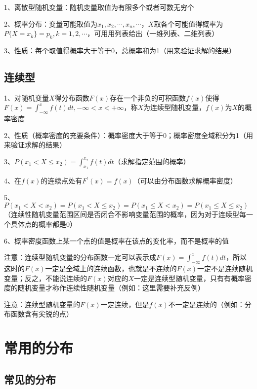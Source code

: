 1、离散型随机变量：随机变量取值为有限多个或者可数无穷个

2、概率分布：变量可能取值为$x_1,x_2,\cdots,x_n,\cdots$，$X$取各个可能值得概率为$P\{ X = x_k \} = p_k, k=1,2,\cdots$，可用用列表给出（一维列表、二维列表）

3、性质：每个取值得概率大于等于0，总概率和为1（用来验证求解的结果）



\subsection{连续型}

1、对随机变量$X$得分布函数$F(x)$存在一个非负的可积函数$f(x)$使得$F(x)=\int_{-\infty}^xf(t)dt,-\infty <x<+\infty$，称$X$为连续型随机变量，$f(x)$为$X$的概率密度

2、性质（概率密度的充要条件）：概率密度大于等于0；概率密度全域积分为1（用来验证求解的结果）

3、$P(x_1 < X \le x_2) = \int_{x_1}^{x_2}f(t)dt$（求解指定范围的概率）

4、在$f(x)$的连续点处有$F^{'}(x)=f(x)$（可以由分布函数求解概率密度）

5、$P(x_1 < X < x_2) = P(x_1 < X \le x_2) = P(x_1 \le X < x_2) = P(x_1 \le X \le x_2)$（连续性随机变量范围区间是否闭合不影响变量范围的概率，因为对于连续型每一个具体点的概率都是0）

6、概率密度函数上某一个点的值是概率在该点的变化率，而不是概率的值

注意：连续型随机变量的分布函数一定可以表示成$F(x)=\int_{-\infty}^xf(t)dt$，所以这时的$F(x)$一定是全域上的连续函数，也就是不连续的$F(x)$一定不是连续随机变量；反之，不能说连续的$F(x)$对应的$X$一定是连续型随机变量，只有有概率密度的随机变量才称作连续性随机变量（例如：这里需要补充反例）

注意：连续型随机变量的$F(x)$一定连续，但是$f(x)$不一定是连续的（例如：分布函数含有尖锐的点）



\section{常用的分布}



\subsection{常见的分布}

